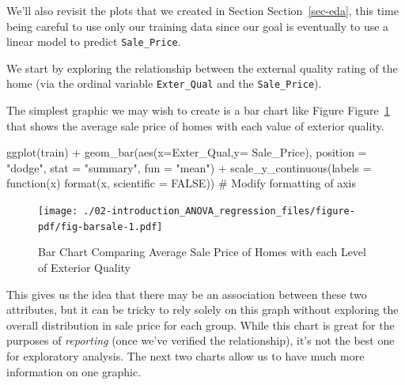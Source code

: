 \documentclass[
  letterpaper,
  DIV=11,
  numbers=noendperiod]{scrreprt}
\newenvironment{Shaded}{\begin{snugshade}}{\end{snugshade}}
\newcommand{\AttributeTok}[1]{\textcolor[rgb]{0.40,0.45,0.13}{#1}}
\newcommand{\CommentTok}[1]{\textcolor[rgb]{0.37,0.37,0.37}{#1}}
\newcommand{\ConstantTok}[1]{\textcolor[rgb]{0.56,0.35,0.01}{#1}}
\newcommand{\ControlFlowTok}[1]{\textcolor[rgb]{0.00,0.23,0.31}{#1}}
\newcommand{\FunctionTok}[1]{\textcolor[rgb]{0.28,0.35,0.67}{#1}}
\newcommand{\NormalTok}[1]{\textcolor[rgb]{0.00,0.23,0.31}{#1}}
\newcommand{\SpecialCharTok}[1]{\textcolor[rgb]{0.37,0.37,0.37}{#1}}
\newcommand{\StringTok}[1]{\textcolor[rgb]{0.13,0.47,0.30}{#1}}
\begin{document}
We'll also revisit the plots that we created in Section
Section~\ref{sec-eda}, this time being careful to use only our training
data since our goal is eventually to use a linear model to predict
\texttt{Sale\_Price}.

We start by exploring the relationship between the external quality
rating of the home (via the ordinal variable \texttt{Exter\_Qual} and
the \texttt{Sale\_Price}).

The simplest graphic we may wish to create is a bar chart like Figure
Figure~\ref{fig-barsale} that shows the average sale price of homes with
each value of exterior quality.

\begin{Shaded}
\begin{Highlighting}[]
\FunctionTok{ggplot}\NormalTok{(train) }\SpecialCharTok{+} 
  \FunctionTok{geom\_bar}\NormalTok{(}\FunctionTok{aes}\NormalTok{(}\AttributeTok{x=}\NormalTok{Exter\_Qual,}\AttributeTok{y=}\NormalTok{ Sale\_Price), }
           \AttributeTok{position =} \StringTok{"dodge"}\NormalTok{, }\AttributeTok{stat =} \StringTok{"summary"}\NormalTok{, }\AttributeTok{fun =} \StringTok{"mean"}\NormalTok{) }\SpecialCharTok{+}                                      
  \FunctionTok{scale\_y\_continuous}\NormalTok{(}\AttributeTok{labels =} \ControlFlowTok{function}\NormalTok{(x) }\FunctionTok{format}\NormalTok{(x, }\AttributeTok{scientific =} \ConstantTok{FALSE}\NormalTok{)) }\CommentTok{\# Modify formatting of axis}
\end{Highlighting}
\end{Shaded}

\begin{figure}[H]

{\centering \texttt{[image: ./02-introduction\_ANOVA\_regression\_files/figure-pdf/fig-barsale-1.pdf]}

}

\caption{\label{fig-barsale}Bar Chart Comparing Average Sale Price of
Homes with each Level of Exterior Quality}

\end{figure}

This gives us the idea that there may be an association between these
two attributes, but it can be tricky to rely solely on this graph
without exploring the overall distribution in sale price for each group.
While this chart is great for the purposes of \emph{reporting} (once
we've verified the relationship), it's not the best one for exploratory
analysis. The next two charts allow us to have much more information on
one graphic.
\end{document}
